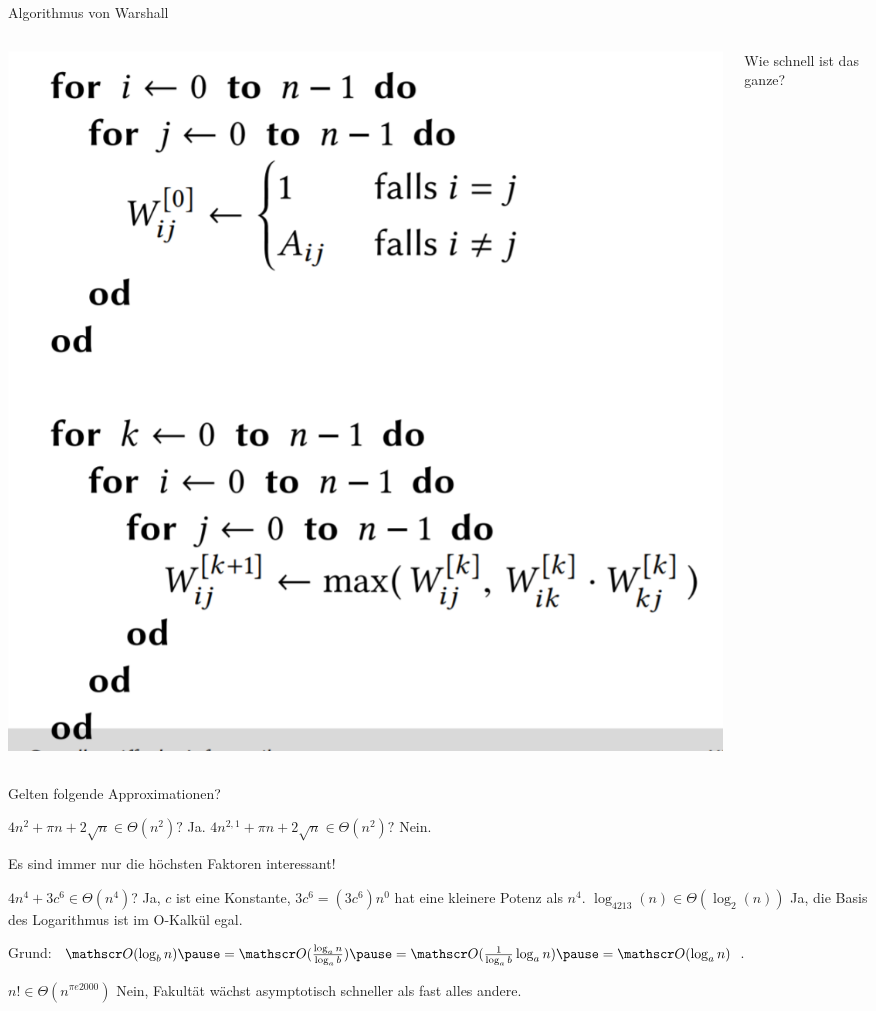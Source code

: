 \documentclass[handout]{beamer}
\begin{document}
\begin{frame}{Algorithmus von Warshall}
	\begin{columns}
		\begin{column}{0.7\textwidth}
			\includegraphics[scale=0.5]{images/warshall.png}\\
		\end{column}
		\begin{column}{0.3\textwidth}
			Wie schnell ist das ganze?
		\end{column}
	\end{columns}
\end{frame}

\begin{frame}
Gelten folgende Approximationen?

\begin{itemize}
	\pitem $4n^2 + \pi n + 2 \sqrt{n} \in \Theta(n^2)?$ \pause Ja.
	\pitem $4n^{2,1} + \pi n + 2 \sqrt{n} \in \Theta(n^2)?$ \pause Nein.
\end{itemize}

\bp Es sind immer nur die höchsten Faktoren interessant!

\begin{itemize}
	\pitem $4n^4 + 3c^6 \in \Theta(n^4)$? \pause Ja\ip, $c$ ist eine Konstante, $3c^6=(3c^6)n^0$ hat eine kleinere Potenz als $n^4$.
	\pitem $\log_{4213}(n) \in \Theta(\log_2(n))$ \pause Ja\ip, die Basis des Logarithmus ist im O-Kalkül egal.
	
	\begin{itemize}
		\pitem Grund: $\okalk(\log_b n) \ip= \okalk(\frac{\log_a n}{\log_a b}) \ip = \okalk(\frac{1}{\log_a b}\log_a n) \ip = \okalk(\log_a n)$.
	\end{itemize}
	
	\pitem $n! \in \Theta(n^{\pi e 2000})$ \pause Nein\ip, Fakultät wächst asymptotisch schneller als fast alles andere.
\end{itemize}
\end{frame}
\end{document}
